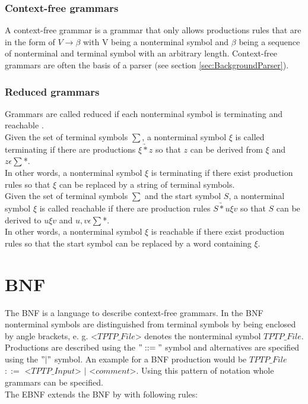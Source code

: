 \subsubsection{Context-free grammars}

A context-free grammar is a grammar that only allows productions rules that are in the form of $V \rightarrow \beta$ with V being a nonterminal symbol and $\beta$ being a sequence of nonterminal and terminal symbol with an arbitrary length.
Context-free grammars are often the basis of a parser (see section \ref{sec:BackgroundParser}). \cite{AutomataTheory.2007}

\subsubsection{Reduced grammars}

Grammars are called reduced if each nonterminal symbol is terminating and reachable \cite{Cremers75}.\\
Given the set of terminal symbols $\sum$, a nonterminal symbol $\xi$ is called terminating if there are productions $\xi \underrightarrow{*} z$ so that $z$ can be derived from $\xi$ and $z \epsilon \sum$*.\\
In other words, a nonterminal symbol $\xi$ is terminating if there exist production rules so that  $\xi$ can be replaced by a string of terminal symbols. \cite{Cremers75}\\
Given the set of terminal symbols $\sum$ and the start symbol $S$, a nonterminal symbol $\xi$ is called reachable if there are production rules $S \underrightarrow{*} u\xi v$ so that $S$ can be derived to $u\xi v$ and $u,v \epsilon \sum$*.\\
In other words, a nonterminal symbol $\xi$ is reachable if there exist production rules so that the start symbol can be replaced by a word containing $\xi$. \cite{Cremers75}


\section{\acf{BNF}}\label{sec:BackgroundBNF}

The \acf{BNF} is a language to describe context-free grammars.
In the \acf{BNF} nonterminal symbols are distinguished from terminal symbols by being enclosed by  angle brackets, e. g. <$TPTP\_File$> denotes the nonterminal symbol $TPTP\_File$.
Productions are described using the $"::="$ symbol and alternatives are specified using the $"|"$ symbol. \cite{BNF.1964}
An example for a \ac{BNF} production would be $TPTP\_File$ $::=$ <$TPTP\_Input$> $|$ <$comment$>.
Using this pattern of notation whole grammars can be specified.\\
The \ac{EBNF} extends the \ac{BNF} by with following rules:

